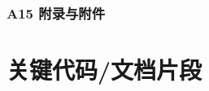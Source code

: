 \documentclass[UTF8]{ctexart}
\begin{document}
\subsubsection{A15 附录与附件}



\section{关键代码/文档片段}




\end{document}
